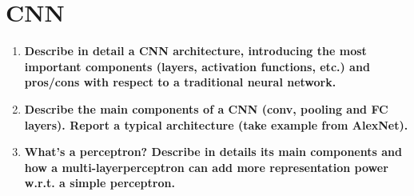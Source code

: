 \documentclass[12pt]{article}
\begin{document}
\section{CNN}
\begin{enumerate}
    \item \textbf{Describe in detail a CNN architecture, introducing the most important components (layers, activation functions, etc.)
              and pros/cons with respect to a traditional neural network.}

    \item \textbf{Describe the main components of a CNN (conv, pooling and FC layers). Report a typical architecture (take example from AlexNet).}

    \item \textbf{What’s a perceptron? Describe in details its main components and how a multi-layerperceptron can add more representation power w.r.t. a simple perceptron.}

\end{enumerate}
\end{document}

